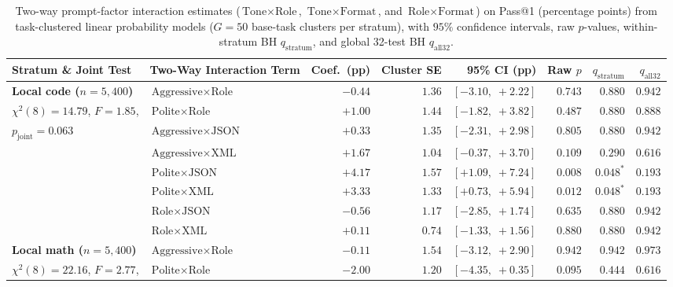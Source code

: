 \documentclass[a4paper,fleqn]{cas-sc}
\begin{document}
\begin{table}[htbp]
\centering
\caption{Two-way prompt-factor interaction estimates ($\text{Tone} \times \text{Role}$, $\text{Tone} \times \text{Format}$, and $\text{Role} \times \text{Format}$) on Pass@1 (percentage points) from task-clustered linear probability models ($G = 50$ base-task clusters per stratum), with $95\%$ confidence intervals, raw $p$-values, within-stratum BH $q_{\text{stratum}}$, and global 32-test BH $q_{\text{all32}}$.}\label{tab:two-way-interactions}
\footnotesize
\setlength{\tabcolsep}{4.5pt}
\begin{tabular}{@{}llrrrrrr@{}}
\toprule
\textbf{Stratum \& Joint Test} & \textbf{Two-Way Interaction Term} & \textbf{Coef.\ (pp)} & \textbf{Cluster SE} & \textbf{95\% CI (pp)} & \textbf{Raw $p$} & \textbf{$q_{\text{stratum}}$} & \textbf{$q_{\text{all32}}$} \\
\midrule
\textbf{Local code ($n = 5,400$)} & $\text{Aggressive} \times \text{Role}$ & $-0.44$ & $1.36$ & $[-3.10,\; +2.22]$ & $0.743$ & $0.880$ & $0.942$ \\
$\chi^2(8) = 14.79$, $F = 1.85$, & $\text{Polite} \times \text{Role}$ & $+1.00$ & $1.44$ & $[-1.82,\; +3.82]$ & $0.487$ & $0.880$ & $0.888$ \\
$p_{\text{joint}} = 0.063$ & $\text{Aggressive} \times \text{JSON}$ & $+0.33$ & $1.35$ & $[-2.31,\; +2.98]$ & $0.805$ & $0.880$ & $0.942$ \\
 & $\text{Aggressive} \times \text{XML}$ & $+1.67$ & $1.04$ & $[-0.37,\; +3.70]$ & $0.109$ & $0.290$ & $0.616$ \\
 & $\text{Polite} \times \text{JSON}$ & $+4.17$ & $1.57$ & $[+1.09,\; +7.24]$ & $0.008$ & $0.048^*$ & $0.193$ \\
 & $\text{Polite} \times \text{XML}$ & $+3.33$ & $1.33$ & $[+0.73,\; +5.94]$ & $0.012$ & $0.048^*$ & $0.193$ \\
 & $\text{Role} \times \text{JSON}$ & $-0.56$ & $1.17$ & $[-2.85,\; +1.74]$ & $0.635$ & $0.880$ & $0.942$ \\
 & $\text{Role} \times \text{XML}$ & $+0.11$ & $0.74$ & $[-1.33,\; +1.56]$ & $0.880$ & $0.880$ & $0.942$ \\
\midrule
\textbf{Local math ($n = 5,400$)} & $\text{Aggressive} \times \text{Role}$ & $-0.11$ & $1.54$ & $[-3.12,\; +2.90]$ & $0.942$ & $0.942$ & $0.973$ \\
$\chi^2(8) = 22.16$, $F = 2.77$, & $\text{Polite} \times \text{Role}$ & $-2.00$ & $1.20$ & $[-4.35,\; +0.35]$ & $0.095$ & $0.444$ & $0.616$ \\

\end{tabular}
\end{table}
\end{document}
